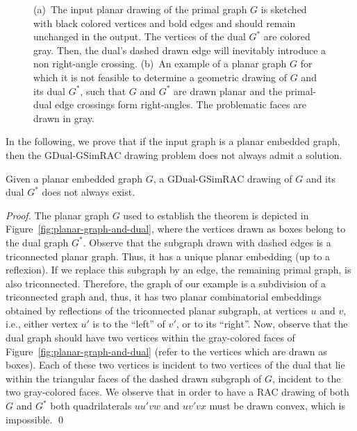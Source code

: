 \documentclass{llncs}
\newcommand{\GDual}{\mathrm{GDual\text{-}GSimRAC}}
\begin{document}
\begin{figure}[t!hb]
  \centering
  \begin{minipage}[b]{.43\textwidth}
     \centering
  \end{minipage}
  \hfill
  \begin{minipage}[b]{.52\textwidth}
     \centering
  \end{minipage}
  \caption{(a)~The input planar drawing of the primal graph $G$ is sketched with black colored vertices and bold edges and should remain
  unchanged in the output. The vertices of the dual $G^*$ are colored gray. Then, the dual's dashed drawn edge will inevitably introduce a non right-angle crossing.
  (b)~An example of a planar graph $G$ for which it is not feasible to determine a geometric drawing of $G$ and its dual $G^*$, such that $G$ and $G^*$
are drawn planar and the primal-dual edge crossings form
right-angles. The problematic faces are drawn in gray.}
  \label{fig:ata-graph}
\end{figure}


In the following, we prove that if the input graph is a planar
embedded graph, then the $\GDual$ drawing problem does not always
admit a solution.

\begin{theorem}
\label{thm:planar-embedded}Given a planar embedded graph $G$, a
$\GDual$ drawing of $G$ and its dual $G^*$ does not always exist.
\end{theorem}

\begin{proof}
The planar graph $G$ used to establish the theorem is depicted in
Figure~\ref{fig:planar-graph-and-dual}, where the vertices drawn as
boxes belong to the dual graph $G^*$. Observe that the subgraph
drawn with dashed edges is a triconnected planar graph. Thus, it has
a unique planar embedding (up to a reflexion). If we replace this
subgraph by an edge, the remaining primal graph, is also
triconnected. Therefore, the graph of our example is a subdivision
of a triconnected graph and, thus, it has two planar combinatorial
embeddings obtained by reflections of the triconnected planar
subgraph, at vertices $u$ and $v$, i.e., either vertex $u'$ is to
the ``left'' of $v'$, or to its ``right''. Now, observe that the
dual graph should have two vertices within the gray-colored faces of
Figure~\ref{fig:planar-graph-and-dual} (refer to the vertices which
are drawn as boxes). Each of these two vertices is incident to two
vertices of the dual that lie within the triangular faces of the
dashed drawn subgraph of $G$, incident to the two gray-colored
faces. We observe that in order to have a RAC drawing of both $G$
and $G^*$ both quadrilaterals $uu'vw$ and $uv'vx$ must be drawn
convex, which is impossible. \qed
\end{proof}
\end{document}
